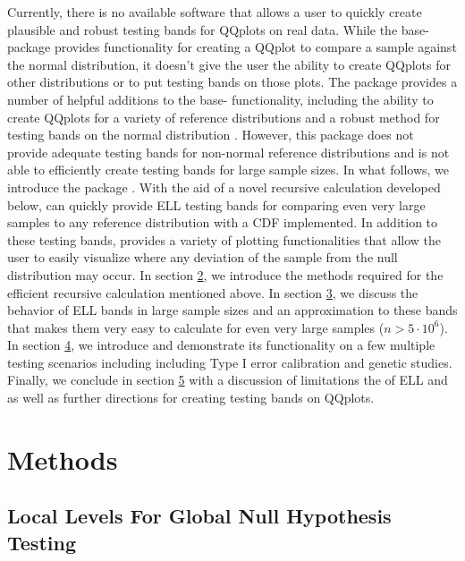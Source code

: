 \documentclass[article]{jss}
\begin{document}
\newline
\newline
Currently, there is no available software that allows a user to quickly create plausible and robust testing bands for QQplots on real data. While the base- package  provides functionality for creating a QQplot to compare a sample against the normal distribution, it doesn't give the user the ability to create QQplots for other distributions or to put testing bands on those plots. The package  provides a number of helpful additions to the base- functionality, including the ability to create QQplots for a variety of reference distributions and a robust method for testing bands on the normal distribution \citep{qqplotr}. However, this package does not provide adequate testing bands for non-normal reference distributions and is not able to efficiently create testing bands for large sample sizes.
\newline
\newline
In what follows, we introduce the  package . With the aid of a novel recursive calculation developed below,  can quickly provide ELL testing bands for comparing even very large samples to any reference distribution with a CDF implemented. In addition to these testing bands,  provides a variety of plotting functionalities that allow the user to easily visualize where any deviation of the sample from the null distribution may occur. In section \hyperref[sec:methods]{2}, we introduce the methods required for the efficient recursive calculation mentioned above. In section \hyperref[sec:methods]{3}, we discuss the behavior of ELL bands in large sample sizes and an approximation to these bands that makes them very easy to calculate for even very large samples ($n > 5 \cdot 10^{6}$). In section \hyperref[sec:examples]{4}, we introduce  and demonstrate its functionality on a few multiple testing scenarios including including Type I error calibration and genetic studies. Finally, we conclude in section \hyperref[sec:discussion]{5} with a discussion of limitations the of ELL and  as well as further directions for creating testing bands on QQplots.
\section{Methods}
\label{sec:methods}

\subsection{Local Levels For Global Null Hypothesis Testing}
\end{document}
